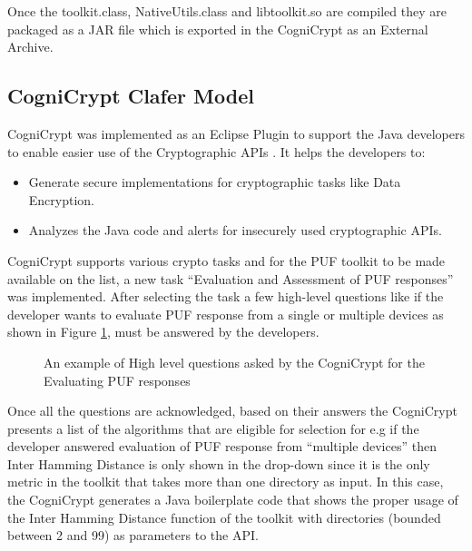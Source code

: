 Once the toolkit.class, NativeUtils.class and libtoolkit.so are compiled they are packaged as a JAR file which is exported in the CogniCrypt as an External Archive.

\subsection{CogniCrypt Clafer Model}
CogniCrypt was implemented as an Eclipse Plugin to support the Java developers to enable easier use of the Cryptographic APIs \cite{cogni}. It helps the developers to:
\begin{itemize}
	\item Generate secure implementations for cryptographic tasks like Data Encryption.
	\item Analyzes the Java code and alerts for insecurely used cryptographic APIs.
\end{itemize}

CogniCrypt supports various crypto tasks and for the PUF toolkit to be made available on the list, a new task ``Evaluation and Assessment of PUF responses'' was implemented. After selecting the task a few high-level questions like if the developer wants to evaluate PUF response from a single or multiple devices as shown in Figure \ref{img:cogni_ques}, must be answered by the developers.\\

\begin{figure}[h]
\centering
{}
\caption{An example of High level questions asked by the CogniCrypt for the Evaluating PUF responses}
\label{img:cogni_ques}
\end{figure}

Once all the questions are acknowledged, based on their answers the CogniCrypt presents a list of the algorithms that are eligible for selection for e.g if the developer answered evaluation of PUF response from ``multiple devices'' then Inter Hamming Distance is only shown in the drop-down since it is the only metric in the toolkit that takes more than one directory as input. In this case, the CogniCrypt generates a Java boilerplate code that shows the proper usage of the Inter Hamming Distance
function of the toolkit with directories (bounded between 2 and 99) as parameters to the API.\\

